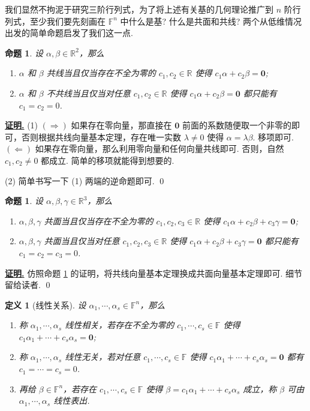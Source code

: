 \documentclass[10pt,openany]{article}
\theoremstyle{thmstyle} %
\theoremstyle{defstyle} %
\newtheorem{definition}[theorem]{定义}
\theoremstyle{prostyle} %
\newtheorem{proposition}[theorem]{命题}
\theoremstyle{exastyle}
\theoremstyle{remstyle}
\renewenvironment{proof}[1][证明]{\par\underline{\textbf{#1.}} \;\fangsong}{\qed\par}
\newcommand{\F}{\mathbb{F}}
\newcommand{\R}{\mathbb{R}}
\begin{document}
我们显然不拘泥于研究三阶行列式，为了将上述有关基的几何理论推广到 \( n \) 阶行列式，至少我们要先刻画在 \( \F^n \) 中什么是基? 什么是共面和共线? 两个从低维情况出发的简单命题启发了我们这一点.

\begin{proposition} \label{2.3.5}
    设 \( \alpha, \beta \in \R^2 \)，那么
    \begin{enumerate}[(1)]
    	\item \( \alpha \) 和 \( \beta \) 共线当且仅当存在不全为零的 \( c_1,c_2 \in \R \) 使得 \( c_1\alpha+c_2\beta=\bm{0} \);
    	\item \( \alpha \) 和 \( \beta \) 不共线当且仅当对任意 \( c_1,c_2 \in \R \) 使得 \( c_1\alpha+c_2\beta=\bm{0} \) 都只能有 \( c_1=c_2=0 \).
    \end{enumerate}  
\end{proposition}

\begin{proof}
	(1) \( (\Rightarrow) \) 如果存在零向量，那直接在 \( \bm{0} \) 前面的系数随便取一个非零的即可，否则根据共线向量基本定理，存在唯一实数 \( \lambda \neq 0 \) 使得 \( \alpha=\lambda \beta \). 移项即可. \( (\Leftarrow) \) 如果存在零向量，那么利用零向量和任何向量共线即可. 否则，自然 \( c_1,c_2 \neq 0 \) 都成立. 简单的移项就能得到想要的.
	
	(2) 简单书写一下 (1) 两端的逆命题即可. 
\end{proof}

\begin{proposition}
	设 \( \alpha, \beta, \gamma \in \R^3 \)，那么
	\begin{enumerate}[(1)]
		\item \( \alpha , \beta, \gamma \) 共面当且仅当存在不全为零的 \( c_1,c_2,c_3 \in \R \) 使得 \( c_1\alpha+c_2\beta+c_3\gamma=\bm{0} \);
		\item \( \alpha , \beta, \gamma \) 共面当且仅当对任意 \( c_1,c_2,c_3 \in \R \) 使得 \( c_1\alpha+c_2\beta+c_3\gamma=\bm{0} \) 都只能有 \( c_1=c_2=c_3=0 \).
	\end{enumerate}  
\end{proposition}

\begin{proof}
	仿照命题 \ref{2.3.5} 的证明，将共线向量基本定理换成共面向量基本定理即可. 细节留给读者.
\end{proof}

\begin{definition}[线性关系]
	设 \( \alpha_1,\cdots,\alpha_s \in \F^n \)，那么
	\begin{enumerate}[(1)]
		\item 称 \( \alpha_1,\cdots,\alpha_s \) 线性相关，若存在不全为零的 \( c_1,\cdots,c_s \in \F \) 使得 \( c_1\alpha_1+\cdots+c_s\alpha_s= \bm{0} \);
		\item 称 \( \alpha_1,\cdots,\alpha_s \) 线性无关，若对任意 \( c_1,\cdots,c_s \in \F \) 使得 \( c_1\alpha_1+\cdots+c_s\alpha_s= \bm{0} \) 都有 \( c_1=\cdots=c_s=0 \).
		\item 再给 \( \beta \in \F^n \)，若存在 \( c_1,\cdots,c_s \in \F \) 使得 \( \beta= c_1\alpha_1+\cdots+c_s\alpha_s \) 成立，称 \( \beta \) 可由 \( \alpha_1,\cdots,\alpha_s \) 线性表出.
	\end{enumerate} 
\end{definition}
\end{document}
